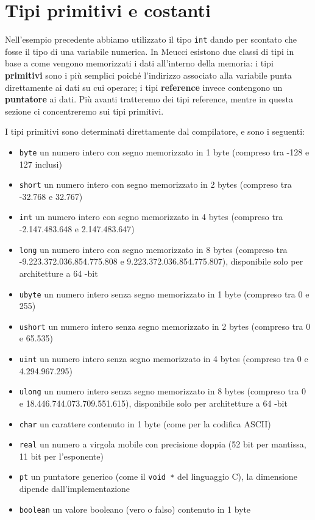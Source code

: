 \documentclass[10pt]{book}%
\newcommand{\ac}[1]{\`{#1}}
\newcommand{\code}[1]{\texttt{#1}}
\renewcommand{\emph}[1]{\textbf{#1}}
\begin{document}
\section{Tipi primitivi e costanti}
Nell'esempio precedente abbiamo utilizzato il tipo \code{int} dando per scontato che fosse il tipo di una variabile numerica. In Meucci esistono due classi di tipi in base a come vengono memorizzati i dati all'interno della memoria: i tipi \emph{primitivi} sono i pi\ac u semplici poich\'e l'indirizzo associato alla variabile punta direttamente ai dati su cui operare; i tipi \emph{reference} invece contengono un \emph{puntatore} ai dati. Pi\ac u avanti tratteremo dei tipi reference, mentre in questa sezione ci concentreremo sui tipi primitivi.

I tipi primitivi sono determinati direttamente dal compilatore, e sono i seguenti:
\begin{itemize}
\item \code{byte} un numero intero con segno memorizzato in 1 byte (compreso tra -128 e 127 inclusi)
\item \code{short} un numero intero con segno memorizzato in 2 bytes (compreso tra -32.768 e 32.767)
\item \code{int} un numero intero con segno memorizzato in 4 bytes (compreso tra -2.147.483.648 e 2.147.483.647)
\item \code{long} un numero intero con segno memorizzato in 8 bytes (compreso tra -9.223.372.036.854.775.808 e 9.223.372.036.854.775.807), disponibile solo per architetture a 64 -bit
\item \code{ubyte} un numero intero senza segno memorizzato in 1 byte (compreso tra 0 e 255)
\item \code{ushort} un numero intero senza segno memorizzato in 2 bytes (compreso tra 0 e 65.535)
\item \code{uint} un numero intero senza segno memorizzato in 4 bytes (compreso tra 0 e 4.294.967.295)
\item \code{ulong} un numero intero senza segno memorizzato in 8 bytes (compreso tra 0 e 18.446.744.073.709.551.615), disponibile solo per architetture a 64 -bit
\item \code{char} un carattere contenuto in 1 byte (come per la codifica ASCII)
\item \code{real} un numero a virgola mobile con precisione doppia (52 bit per mantissa, 11 bit per l'esponente)
\item \code{pt} un puntatore generico (come il \code{void *} del linguaggio C), la dimensione dipende dall'implementazione
\item \code{boolean} un valore booleano (vero o falso) contenuto in 1 byte
\end{itemize}
\end{document}
